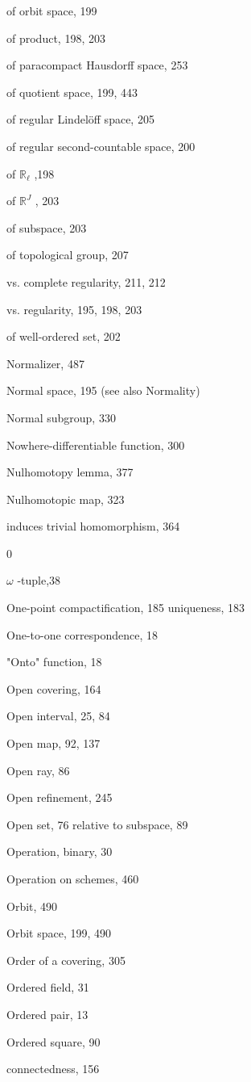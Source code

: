 of orbit space, 199

of product, 198, 203

of paracompact Hausdorff space, 253

of quotient space, 199, 443

of regular Lindelöff space, 205

of regular second-countable space, 200

of \({\mathbb{R}}_{\ell }\) ,198

of \({\mathbb{R}}^{J}\) , 203

of subspace, 203

of topological group, 207

vs. complete regularity, 211, 212

vs. regularity, 195, 198, 203

of well-ordered set, 202

Normalizer, 487

Normal space, 195 (see also Normality)

Normal subgroup, 330

Nowhere-differentiable function, 300

Nulhomotopy lemma, 377

Nulhomotopic map, 323

induces trivial homomorphism, 364

0

\(\omega\) -tuple,38

One-point compactification, 185 uniqueness, 183

One-to-one correspondence, 18

"Onto" function, 18

Open covering, 164

Open interval, 25, 84

Open map, 92, 137

Open ray, 86

Open refinement, 245

Open set, 76 relative to subspace, 89

Operation, binary, 30

Operation on schemes, 460

Orbit, 490

Orbit space, 199, 490

Order of a covering, 305

Ordered field, 31

Ordered pair, 13

Ordered square, 90

connectedness, 156

